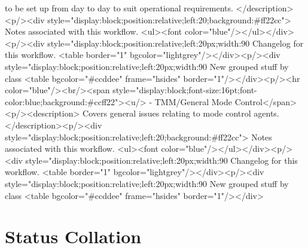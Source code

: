 	to be set up from day to day to suit operational requirements.
      </description><p/><div style="display:block;position:relative;left:20;background:#ff22cc">
      Notes associated with this workflow.
      <ul><font color="blue"/></ul></div><p/><div style="display:block;position:relative;left:20px;width:90%
      Changelog for this workflow.
      <table border="1" bgcolor="lightgrey"/></div><p/><div style="display:block;position:relative;left:20px;width:90%
     New grouped stuff by class
     <table bgcolor="#ccddee" frame="hsides" border="1"/></div><p/><hr color="blue"/><br/><span style="display:block;font-size:16pt;font-color:blue;background:#ccff22"><u/> -    TMM/General Mode Control</span><p/><description>
      Covers general issues relating to mode control agents.
</description><p/><div style="display:block;position:relative;left:20;background:#ff22cc">
      Notes associated with this workflow.
      <ul><font color="blue"/></ul></div><p/><div style="display:block;position:relative;left:20px;width:90%
      Changelog for this workflow.
      <table border="1" bgcolor="lightgrey"/></div><p/><div style="display:block;position:relative;left:20px;width:90%
     New grouped stuff by class
     <table bgcolor="#ccddee" frame="hsides" border="1"/></div>

    \section{Status Collation}

